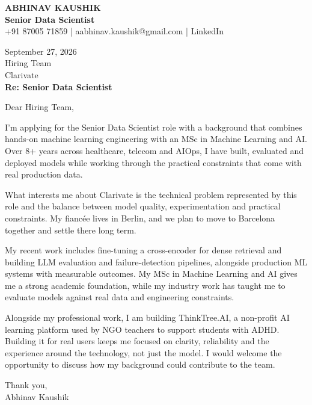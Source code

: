 \documentclass[10pt,a4paper]{article}
\begin{document}
\begin{center}
{\Large\bfseries ABHINAV KAUSHIK}\\[2pt]
{\bfseries Senior Data Scientist}\\[2pt]
+91 87005 71859 \quad | \quad aabhinav.kaushik@gmail.com \quad | \quad LinkedIn
\end{center}
\vspace{8pt}
September 27, 2026\\[6pt]
Hiring Team\\
Clarivate\\[4pt]
\textbf{Re: Senior Data Scientist}

Dear Hiring Team,

I’m applying for the Senior Data Scientist role with a background that combines hands-on machine learning engineering with an MSc in Machine Learning and AI. Over 8+ years across healthcare, telecom and AIOps, I have built, evaluated and deployed models while working through the practical constraints that come with real production data.

What interests me about Clarivate is the technical problem represented by this role and the balance between model quality, experimentation and practical constraints. My fiancée lives in Berlin, and we plan to move to Barcelona together and settle there long term.

My recent work includes fine-tuning a cross-encoder for dense retrieval and building LLM evaluation and failure-detection pipelines, alongside production ML systems with measurable outcomes. My MSc in Machine Learning and AI gives me a strong academic foundation, while my industry work has taught me to evaluate models against real data and engineering constraints.

Alongside my professional work, I am building ThinkTree.AI, a non-profit AI learning platform used by NGO teachers to support students with ADHD. Building it for real users keeps me focused on clarity, reliability and the experience around the technology, not just the model. I would welcome the opportunity to discuss how my background could contribute to the team.

Thank you,\\
Abhinav Kaushik
\end{document}
